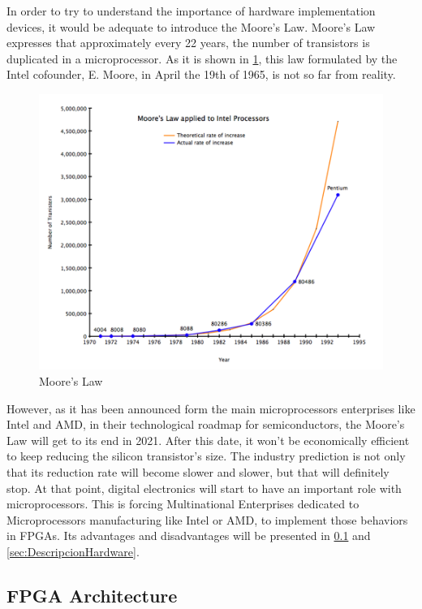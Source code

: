 In order to try to understand the importance of hardware implementation devices, it would be adequate to introduce the Moore’s Law. Moore’s Law expresses that approximately every 22 years, the number of transistors is duplicated in a
microprocessor. As it is shown in \ref{fig:Ley_de_Moore}, this law formulated by the Intel cofounder, E. Moore, in April the 19th of 1965, is not so far from reality.
\newline
\begin{figure}[H]
	\center
	\includegraphics[scale=0.7]{imagenes/EstadoArte/MooresLaw.png}
	\caption{Moore's Law}
	\label{fig:Ley_de_Moore}
\end{figure}
 

However, as it has been announced form the main microprocessors enterprises like Intel and AMD, in their technological roadmap for semiconductors, the Moore’s Law will get to its end in 2021. After this date, it won’t be economically efficient to keep reducing the silicon transistor’s size. The industry prediction is not only that its reduction rate will become slower and slower, but that will definitely stop. At that point, digital electronics will start to have an important role with microprocessors. This is forcing Multinational Enterprises dedicated to Microprocessors manufacturing like Intel or AMD, to implement those behaviors in FPGAs. Its advantages and disadvantages will be presented in \ref{sec:ArquitecturaFPGA} and \ref{sec:DescripcionHardware}.
\newpage
\subsection{FPGA Architecture}\label{sec:ArquitecturaFPGA}

